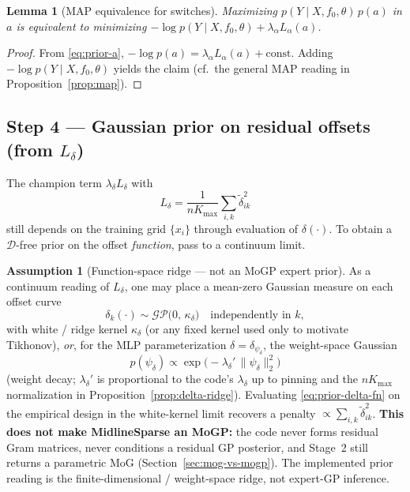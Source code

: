 \documentclass[11pt,a4paper]{article}
\theoremstyle{plain}
\newtheorem{lemma}[theorem]{Lemma}
\theoremstyle{definition}
\newtheorem{assumption}[theorem]{Assumption}
\theoremstyle{remark}
\newcommand{\GP}{\mathcal{GP}}
\newcommand{\D}{\mathcal{D}}
\newcommand{\tht}{\theta}
\newcommand{\Kmax}{K_{\max}}
\begin{document}
\begin{lemma}[MAP equivalence for switches]
\label{lem:map-alpha}
Maximizing \(p(Y\mid X,f_0,\tht)\,p(a)\) in \(a\) is equivalent to minimizing
\(-\log p(Y\mid X,f_0,\tht)+\lambda_\alpha L_\alpha(a)\).
\end{lemma}

\begin{proof}
From \eqref{eq:prior-a}, \(-\log p(a)=\lambda_\alpha L_\alpha(a)+\mathrm{const}\).
Adding \(-\log p(Y\mid X,f_0,\tht)\) yields the claim
(cf.\ the general MAP reading in Proposition~\ref{prop:map}).
\end{proof}

\subsection{Step 4 --- Gaussian prior on residual offsets (from \(L_\delta\))}
The champion term \(\lambda_\delta L_\delta\) with
\[
  L_\delta
  =
  \frac{1}{n\Kmax}
  \sum_{i,k}\tilde\delta_{ik}^{2}
\]
still depends on the training grid \(\{x_i\}\) through evaluation of \(\delta(\cdot)\).
To obtain a \(\D\)-free prior on the offset \emph{function}, pass to a continuum limit.

\begin{assumption}[Function-space ridge --- not an MoGP expert prior]
As a continuum reading of \(L_\delta\), one may place a mean-zero Gaussian measure on
each offset curve
\begin{equation}
  \delta_k(\cdot)
  \sim
  \GP\bigl(0,\,\kappa_\delta\bigr)
  \quad\text{independently in }k,
  \label{eq:prior-delta-fn}
\end{equation}
with white / ridge kernel \(\kappa_\delta\) (or any fixed kernel used only to motivate
Tikhonov), \emph{or}, for the MLP parameterization \(\delta=\delta_{\psi_\delta}\), the
weight-space Gaussian
\begin{equation}
  p(\psi_\delta)
  \propto
  \exp\!\bigl(-\lambda_\delta'\,\|\psi_\delta\|_2^2\bigr)
  \label{eq:prior-psi-delta}
\end{equation}
(weight decay; \(\lambda_\delta'\) is proportional to the code's \(\lambda_\delta\) up to
pinning and the \(n\Kmax\) normalization in Proposition~\ref{prop:delta-ridge}).
Evaluating \eqref{eq:prior-delta-fn} on the empirical design in the white-kernel limit
recovers a penalty \(\propto\sum_{i,k}\tilde\delta_{ik}^{2}\).
\textbf{This does not make MidlineSparse an MoGP:} the code never forms residual Gram
matrices, never conditions a residual GP posterior, and Stage~2 still returns a
parametric MoG (Section~\ref{sec:mog-vs-mogp}). The implemented prior reading is the
finite-dimensional / weight-space ridge, not expert-GP inference.
\end{assumption}
\end{document}
